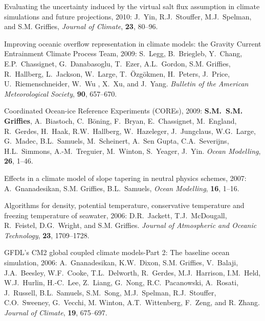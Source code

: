 \begin{etaremune}
\item Evaluating the uncertainty induced by the virtual salt flux assumption in climate simulations and future projections, 2010: J.\
  Yin, R.J.\ Stouffer, M.J.\ Spelman, and S.M. Grif\/f\/ies, {\em Journal of Climate}, {\bf 23}, 80--96.

\item Improving oceanic overflow representation in climate models: the   Gravity Current Entrainment Climate Process Team, 2009: S.\ Legg, B.\ Briegleb, Y.\ Chang, E.P.\ Chassignet, G.\ Danabasoglu, T.\
  Ezer, A.L.\ Gordon, S.M. Grif\/f\/ies, R.\ Hallberg, L.\ Jackson, W.\ Large, T.\ \"Ozg\"okmen, H.\ Peters, J.\ Price, U.\
  Riemenschneider, W.\ Wu , X.\ Xu, and J.\ Yang.  {\em Bulletin of the American Meteorological Society}, {\bf 90}, 657--670.

\item Coordinated Ocean-ice Reference Experiments (COREs), 2009: {\bf
    S.M.\ S.M. Grif\/f\/ies}, A.\ Biastoch, C.\ B\"{o}ning, F.\ Bryan, E.\
  Chassignet, M.\ England, R.\ Gerdes, H.\ Haak, R.W.\ Hallberg, W.\
  Hazeleger, J.\ Jungclaus, W.G.\ Large, G.\ Madec, B.L.\ Samuels, M.\
  Scheinert, A.\ Sen Gupta, C.A.\ Severijns, H.L.\ Simmons, A.-M.\
  Treguier, M.\ Winton, S.\ Yeager, J.\ Yin.  {\em Ocean Modelling},
  {\bf 26}, 1--46.  

\item Effects in a climate model of slope tapering in neutral physics
schemes, 2007: A.\ Gnanadesikan, S.M. Grif\/f\/ies, B.L.\
Samuels, {\em Ocean Modelling}, {\bf 16}, 1--16.
  
\item Algorithms for density, potential temperature, conservative
  temperature and freezing temperature of seawater, 2006: D.R.\
  Jackett, T.J.\ McDougall, R.\ Feistel, D.G.\ Wright, and S.M. Grif\/f\/ies.  {\em Journal of Atmospheric and Oceanic
    Technology}, {\bf 23}, 1709--1728.

\item GFDL's CM2 global coupled climate models-Part 2: The baseline
  ocean simulation, 2006: A.\ Gnanadesikan, K.W.\ Dixon, S.M. Grif\/f\/ies, V.\ Balaji, J.A.\ Beesley, W.F.\ Cooke, T.L.\ Delworth,
  R.\ Gerdes, M.J.\ Harrison, I.M.\ Held, W.J.\ Hurlin, H.-C.\ Lee,
  Z.\ Liang, G.\ Nong, R.C.\ Pacanowski, A.\ Rosati, J.\ Russell,
  B.L.\ Samuels, S.M.\ Song, M.J.\ Spelman, R.J.\ Stouffer, C.O.\
  Sweeney, G.\ Vecchi, M. Winton, A.T.\ Wittenberg, F.\ Zeng, and
  R. Zhang.  {\em Journal of Climate}, {\bf 19}, 675--697.


\end{etaremune}
